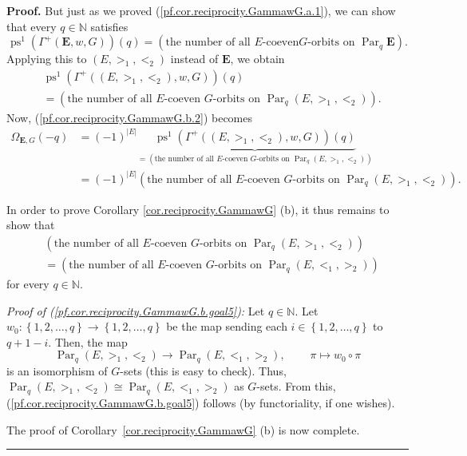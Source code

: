 \documentclass[numbers=enddot,12pt,final,onecolumn,notitlepage,abstracton]{scrartcl}
\theoremstyle{definition}
\newenvironment{proof}[1][Proof]{\noindent\textbf{#1.} }{\ \rule{0.5em}{0.5em}}
\newcommand{\Par}{\operatorname{Par}}
\newcommand{\EE}{{\mathbf{E}}}
\newcommand{\NN}{{\mathbb{N}}}
\begin{document}
\begin{proof}
But just as we proved (\ref{pf.cor.reciprocity.GammawG.a.1}), we can show that
every $q\in \NN $ satisfies
\[
\operatorname{ps}^{1}\left(  \Gamma^{+}\left( \EE ,
w,G\right)  \right)  \left(  q\right)  =\left(  \text{the number of all $E$-coeven
}G\text{-orbits on } \Par_q \EE \right)  .
\]
Applying this to $\left(  E,>_{1},<_{2}\right)  $ instead of $\mathbf{E}$, we
obtain%
\begin{align*}
&  \operatorname{ps}^{1}\left(  \Gamma^{+}\left(  \left(
E,>_{1},<_{2}\right)  ,w,G\right)  \right)  \left(  q\right) \\
&  =\left(  \text{the number of all $E$-coeven }G\text{-orbits on }%
\Par_q \left(  E,>_{1},<_{2}\right)  \right)  .
\end{align*}
Now, (\ref{pf.cor.reciprocity.GammawG.b.2}) becomes%
\begin{align*}
\Omega_{\EE, G}\left(  -q\right)   &  =\left(  -1\right)  ^{\left\vert
E\right\vert }\underbrace{\operatorname{ps}^{1}\left(  \Gamma
^{+}\left(  \left(  E,>_{1},<_{2}\right)  ,w,G\right)  \right)  \left(
q\right)  }_{=\left(  \text{the number of all $E$-coeven }G\text{-orbits on }
\Par_q \left(  E,>_{1},<_{2}\right)  \right)  }\\
&  =\left(  -1\right)  ^{\left\vert E\right\vert }\left(  \text{the number of
all $E$-coeven }G\text{-orbits on }
\Par_q \left( E,>_{1},<_{2}\right)  \right)  .
\end{align*}


In order to prove Corollary \ref{cor.reciprocity.GammawG} (b), it thus remains
to show that
\begin{align}
&  \left(  \text{the number of all $E$-coeven }G\text{-orbits on }%
\Par_{q} \left(  E,>_{1},<_{2}\right)  \right)
\nonumber\\
&  =\left(  \text{the number of all $E$-coeven }G\text{-orbits on }%
\Par_{q} \left(  E,<_{1},>_{2}\right)  \right)
\label{pf.cor.reciprocity.GammawG.b.goal5}
\end{align}
for every $q\in \NN $.

\textit{Proof of (\ref{pf.cor.reciprocity.GammawG.b.goal5}):} Let
$q\in \NN $. Let $w_{0}:\left\{  1,2,\ldots,q\right\}  \rightarrow
\left\{  1,2,\ldots,q\right\}  $ be the map sending each $i\in\left\{
1,2,\ldots,q\right\}  $ to $q+1-i$. Then, the map
\[
 \Par_q \left(  E,>_{1},<_{2}\right)  \rightarrow
 \Par_q \left(  E,<_{1},>_{2}\right)
,\ \ \ \ \ \ \ \ \ \ \pi\mapsto w_{0}\circ\pi
\]
is an isomorphism of $G$-sets (this is easy to check). Thus,
$\Par_q \left(  E,>_{1},<_{2}\right)  \cong
 \Par_q \left(  E,<_{1},>_{2}\right)  $ as $G$-sets.
From this, (\ref{pf.cor.reciprocity.GammawG.b.goal5}) follows (by
functoriality, if one wishes).

The proof of Corollary~\ref{cor.reciprocity.GammawG} (b) is now complete.
\end{proof}
\end{document}
